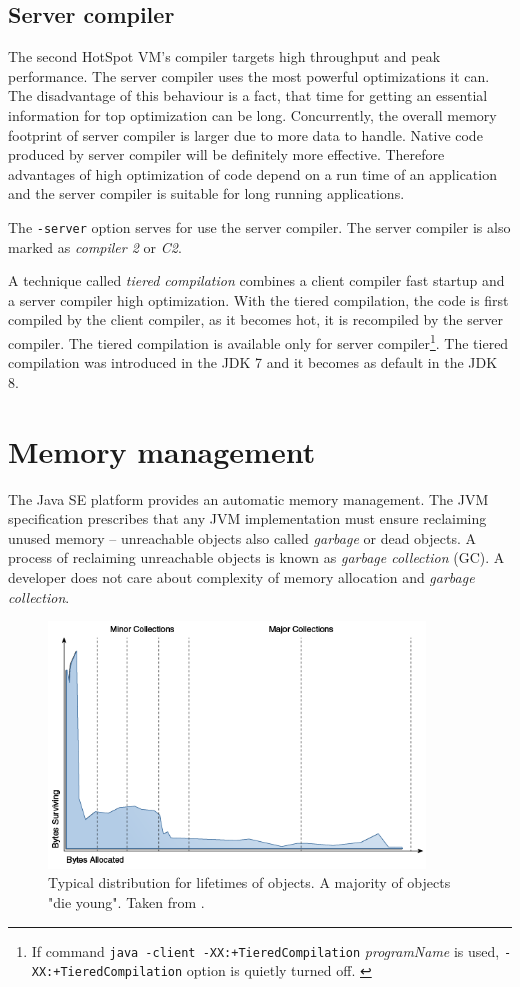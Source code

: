 \documentclass[
  digital, %
  oneside,
  notable, %
  nolof,     %
  nolot     %
]{fithesis3}
\begin{document}
\subsection{Server compiler}\label{servercomp}
The second HotSpot VM's compiler targets high throughput and peak performance. The server compiler uses the most powerful optimizations it can. The disadvantage of this behaviour is a fact, that time for getting an essential information for top optimization can be long. Concurrently, the overall memory footprint of server compiler is larger due to more data to handle. Native code produced by server compiler will be definitely more effective. Therefore advantages of high optimization of code depend on a run time of an application and the server compiler is suitable for long running applications. \cite{hunt}

The \texttt{-server} option serves for use the server compiler. The server compiler is also marked as \textit{compiler 2} or \textit{C2}.

A technique called \textit{tiered compilation} combines a client compiler fast startup and a server compiler high optimization. With the tiered compilation, the code is first compiled by the client compiler, as it becomes hot, it is recompiled by the server compiler. The tiered compilation is available only for server compiler\footnote{If command \texttt{java -client -XX:+TieredCompilation}\textit{ programName} is used, \texttt{-XX:+TieredCompilation} option is quietly turned off. \cite{scott}}. The tiered compilation was introduced in the JDK 7 and it becomes as default in the JDK 8. \cite{scott}
\section{Memory management}\label{memory}
The Java SE platform provides an automatic memory management. The JVM specification prescribes that any JVM implementation must ensure reclaiming unused memory -- unreachable objects also called \textit{garbage} or dead objects. A process of reclaiming unreachable objects is known as \textit{garbage collection} (GC). A developer does not care about complexity of memory allocation and \textit{garbage collection}. \cite{gctuning}

\begin{figure}[h]
	\centering
	\includegraphics[width=10cm]{fig/survive.png}
	\caption{Typical distribution for lifetimes of objects. A majority of objects "die young". Taken from \cite{gctuning}.}
	\label{survive}
\end{figure}
\end{document}
